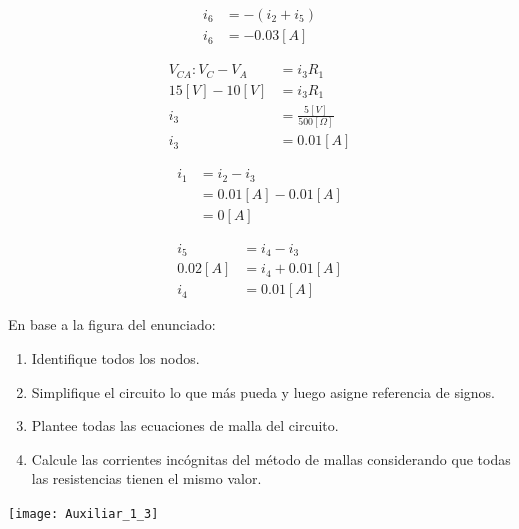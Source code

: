 \documentclass[
  11pt,
  letterpaper,
   addpoints,
   answers
  ]{exam}
\begin{document}
\begin{questions}
\begin{solution}
\begin{enumerate}
\begin{multicols}{2}
        \begin{align*}
            i_6 &= -(i_2 + i_5) \\
            i_6 &= -0.03[A]
        \end{align*}
    
        \columnbreak %
    
        \begin{align*}
            V_{CA} : V_C - V_A &= i_3 R_1 \\
            15[V] - 10[V] &= i_3 R_1 \\
            i_3 &= \frac{5[V]}{500[\Omega]} \\
            i_3 &= 0.01[A]
        \end{align*}
    
        \begin{align*}
            i_1 &= i_2 - i_3 \\
                &= 0.01[A] - 0.01[A] \\
                &= 0[A]
        \end{align*}
    
        \begin{align*}
            i_5 &= i_4 - i_3 \\
            0.02[A] &= i_4 + 0.01[A] \\
            i_4 &= 0.01[A]
        \end{align*}
    
    \end{multicols}
    


    \end{enumerate}

\end{solution}
\question En base a la figura del enunciado:
\begin{enumerate}
    \item Identifique todos los nodos.
    \item Simplifique el circuito lo que más pueda y luego asigne referencia de signos.
    \item Plantee todas las ecuaciones de malla del circuito. 
    \item Calcule las corrientes incógnitas del método de mallas considerando que todas las resistencias tienen el mismo valor.
\end{enumerate}
\begin{center}
    \texttt{[image: Auxiliar\_1\_3]}
\end{center}
\end{questions}
\end{document}
